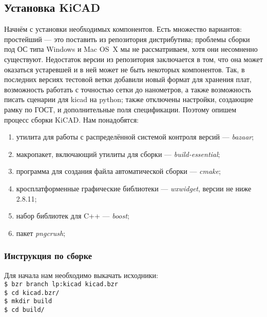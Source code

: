 \subsection{Установка KiCAD} 
Начнём с установки необходимых компонентов.
Есть множество вариантов: простейший --- это поставить из репозитория дистрибутива;
проблемы сборки под ОС типа Windows и Mac OS~X мы не рассматриваем, хотя они несомненно существуют.
Недостаток версии из репозитория заключается в том, что она может оказаться устаревшей и в ней может не быть некоторых компонентов.
Так, в последних версиях тестовой ветки добавили новый формат для хранения плат, возможность работать с точностью сетки до нанометров, а также возможность писать сценарии для kicad на python;
также отключены настройки, создающие рамку по ГОСТ, и дополнительные поля спецификации.
Поэтому опишем процесс сборки KiCAD.
Нам понадобятся:
\begin{enumerate}
 \item утилита для работы с распределённой системой контроля версий --- \emph{bazaar};
 \item макропакет, включающий утилиты для сборки --- \emph{build-essential};
 \item программа для создания файла автоматической сборки --- \emph{cmake};
 \item кросплатформенные графические библиотеки --- \emph{wxwidget}, версии не ниже 2.8.11;
 \item набор библиотек для C++ --- \emph{boost};
 \item пакет \emph{pngcrush};
\end{enumerate}

\subsubsection{Инструкция по сборке}
Для начала нам необходимо выкачать исходники:\\
\texttt{\$ bzr branch lp:kicad kicad.bzr}\\
\texttt{\$ cd kicad.bzr/}\\
\texttt{\$ mkdir build}\\
\texttt{\$ cd build/}\\

